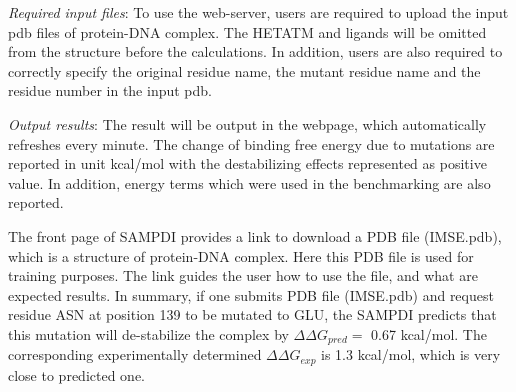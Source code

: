 \documentclass[9pt,tutorial]{livecoms}
\begin{document}
\textit{Required input files}: To use the web-server, users are required to upload the input pdb files of protein-DNA complex. The HETATM and ligands will be omitted from the structure before the calculations. In addition, users are also required to correctly specify the original residue name, the mutant residue name and the residue number in the input pdb.

\textit{Output results}: The result will be output in the webpage, which automatically refreshes every minute. The change of binding free energy due to mutations are reported in unit kcal/mol with the destabilizing effects represented as positive value. In addition, energy terms which were used in the benchmarking are also reported. 

The front page of SAMPDI provides a link to download a PDB file (IMSE.pdb), which is a structure of protein-DNA complex. Here this PDB file is used for training purposes. The link guides the user how to use the file, and what are expected results. In summary, if one submits PDB file (IMSE.pdb) and request residue ASN at position 139 to be mutated to GLU, the SAMPDI predicts that this mutation will de-stabilize the complex by $ \Delta\Delta G_{pred} =$ 0.67 kcal/mol. The corresponding experimentally determined $ \Delta\Delta G_{exp} $ is 1.3 kcal/mol, which is very close to predicted one.
\end{document}
